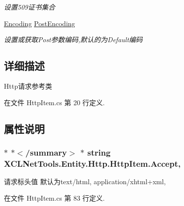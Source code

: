 \begin{DoxyCompactItemize}
\begin{DoxyCompactList}\small\item\em 设置509证书集合 \end{DoxyCompactList}\item 
\hyperlink{class_x_c_l_net_tools_1_1_entity_1_1_http_1_1_http_item_aefaad52c96c7c2b692f3470b61cd75eb}{Encoding} \hyperlink{class_x_c_l_net_tools_1_1_entity_1_1_http_1_1_http_item_ab4d3010b05811df9360aa8651d02302a}{Post\+Encoding}
\begin{DoxyCompactList}\small\item\em 设置或获取\+Post参数编码,默认的为\+Default编码 \end{DoxyCompactList}\end{DoxyCompactItemize}


\subsection{详细描述}
Http请求参考类 



在文件 Http\+Item.\+cs 第 20 行定义.



\subsection{属性说明}
\subsubsection[{\texorpdfstring{Accept}{Accept}}]{\setlength{\rightskip}{0pt plus 5cm}$\ast$ $\ast$$<$/summary$>$ $\ast$ string X\+C\+L\+Net\+Tools.\+Entity.\+Http.\+Http\+Item.\+Accept\hspace{0.3cm}{\ttfamily [get]}, {\ttfamily [set]}}\hypertarget{class_x_c_l_net_tools_1_1_entity_1_1_http_1_1_http_item_a1e43938a270466cf6955b4e161cf25fc}{}\label{class_x_c_l_net_tools_1_1_entity_1_1_http_1_1_http_item_a1e43938a270466cf6955b4e161cf25fc}


请求标头值 默认为text/html, application/xhtml+xml, 



在文件 Http\+Item.\+cs 第 83 行定义.


